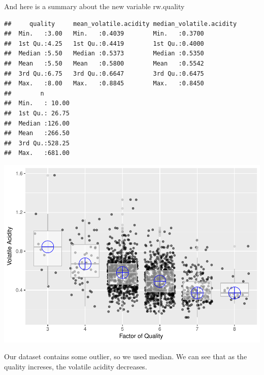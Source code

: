 \documentclass[]{article}
\begin{document}
And here is a summary about the new variable rw.quality

\begin{verbatim}
##     quality     mean_volatile.acidity median_volatile.acidity
##  Min.   :3.00   Min.   :0.4039        Min.   :0.3700         
##  1st Qu.:4.25   1st Qu.:0.4419        1st Qu.:0.4000         
##  Median :5.50   Median :0.5373        Median :0.5350         
##  Mean   :5.50   Mean   :0.5800        Mean   :0.5542         
##  3rd Qu.:6.75   3rd Qu.:0.6647        3rd Qu.:0.6475         
##  Max.   :8.00   Max.   :0.8845        Max.   :0.8450         
##        n         
##  Min.   : 10.00  
##  1st Qu.: 26.75  
##  Median :126.00  
##  Mean   :266.50  
##  3rd Qu.:528.25  
##  Max.   :681.00
\end{verbatim}

\includegraphics{RedWine_files/figure-latex/Quality_Vs_Volatile.Acidity-1.pdf}

Our dataset contains some outlier, so we used median. We can see that as
the quality increses, the volatile acidity decreases.
\end{document}
